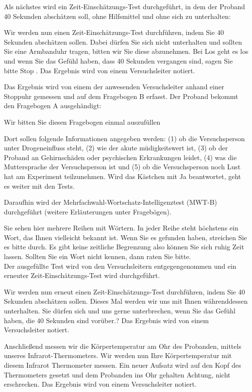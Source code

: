 \documentclass{Bericht}
\begin{document}
Als nächstes wird ein Zeit-Einschätzungs-Test durchgeführt, in dem der Proband 40 Sekunden abschätzen soll, ohne Hilfsmittel und ohne sich zu unterhalten:

\glqq Wir werden nun einen Zeit-Einschätzungs-Test durchführen, indem Sie 40 Sekunden abschätzen sollen. Dabei dürfen Sie sich nicht unterhalten und sollten Sie eine Armbanduhr tragen, bitten wir Sie diese abzunehmen.  Bei \glq Los \glq{} geht es los und wenn Sie das Gefühl haben, dass 40 Sekunden vergangen sind, sagen Sie bitte \glq Stop\grq{} \grqq{}. Das Ergebnis wird von einem Versuchsleiter notiert.

Das Ergebnis wird von einem der anwesenden Versuchsleiter anhand einer Stoppuhr gemessen und auf dem \glqq Fragebogen B\grqq{} erfasst. Der Proband bekommt den \glqq Fragebogen A\grqq{} ausgehändigt:

\glqq Wir bitten Sie diesen Fragebogen einmal auszufüllen\grqq{}

Dort sollen folgende Informationen angegeben werden: (1) ob die Versuchsperson unter Drogeneinfluss steht, (2) wie der akute müdigkeitswert ist, (3) ob der Proband an Gehirnschäden oder psychischen Erkrankungen leidet, (4) was die Muttersprache der Versuchsperson ist und (5) ob die Versuchsperson noch Lust hat am Experiment teilzunehmen. Wird das Kästchen mit \glqq Ja\grqq{} beantwortet, geht es weiter mit den Tests.

Daraufhin wird der \glqq Mehrfachwahl-Wortschatz-Intelligenztest \grqq (MWT-B) durchgeführt (weitere Erläuterungen unter \glqq Fragebögen\grqq). 

\glqq Sie sehen hier mehrere Reihen mit Wörtern. In jeder Reihe steht höchstens ein Wort, das Ihnen vielleicht bekannt ist. Wenn Sie es gefunden haben, streichen Sie es bitte durch. Es  gibt keine zeitliche Begrenzung also können Sie sich ruhig Zeit lassen. Sollten Sie ein Wort nicht kennen, dann raten Sie bitte. \grqq{} \\
Der ausgefüllte Test wird von den Versuchsleitern entgegengenommen und ein erneuter Zeit-Einschätzungs-Test wird durchgeführt. 

\glqq Wir werden nun erneut einen Zeit-Einschätzungs-Test durchführen, indem Sie 40 Sekunden abschätzen sollen. Dieses Mal werden wir uns mit Ihnen währenddessen unterhalten. Sie dürfen sich und uns gerne unterbrechen, wenn Sie das Gefühl haben, die 40 Sekunden sind vorüber.? Das Ergebnis wird von einem Versuchsleiter notiert.

Anschließend messen wir die Körpertemperatur am Ohr des Probanden, mittels unseres Infrarot-Thermometers. \glqq Wir werden nun Ihre Körpertemperatur mit diesem Infrarot Thermometer messen.\grqq{} Ein neuer Aufsatz wird auf den Kopf des Thermometers gesetzt und dem Probanden ins Ohr gehalten \glqq Achtung, nicht erschrecken\grqq{}. Das Ergebnis wird von einem Versuchsleiter notiert.
\end{document}
